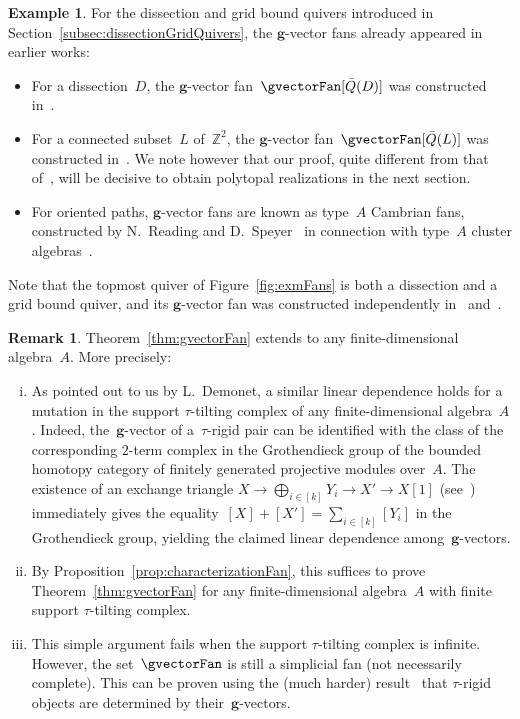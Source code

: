 \documentclass{memo-l}
\theoremstyle{definition}
\newtheorem{example}[theorem]{Example}
\newtheorem{remark}[theorem]{Remark}
\newcommand{\Z}{\mathbb{Z}} %
\renewcommand{\b}[1]{\mathbf{#1}} %
\newcommand{\fref}[1]{Figure~\ref{#1}} %
\begin{document}
\begin{example}
For the dissection and grid bound quivers introduced in Section~\ref{subsec:dissectionGridQuivers}, the $\b{g}$-vector fans already appeared in earlier works:
\begin{itemize}
\item For a dissection~$D$, the $\b{g}$-vector fan~$\gvectorFan[\bar Q(D)]$ was constructed in~\cite{MannevillePilaud-accordion}.
\item For a connected subset~$L$ of~$\Z^2$, the $\b{g}$-vector fan~$\gvectorFan[\bar Q(L)]$ was constructed in~\cite{GarverMcConville-grid}. We note however that our proof, quite different from that of~\cite{GarverMcConville-grid}, will be decisive to obtain polytopal realizations in the next section.
\item For oriented paths, $\b{g}$-vector fans are known as type~$A$ Cambrian fans, constructed by N.~Reading and D.~Speyer~\cite{ReadingSpeyer} in connection with type~$A$ cluster algebras~\cite{FominZelevinsky-ClusterAlgebrasI, FominZelevinsky-ClusterAlgebrasII}.
\end{itemize}
Note that the topmost quiver of \fref{fig:exmFans} is both a dissection and a grid bound quiver, and its $\b{g}$-vector fan was constructed independently in~\cite{MannevillePilaud-accordion} and~\cite{GarverMcConville-grid}.
\end{example}

\begin{remark}
\label{rem:linDep}
Theorem~\ref{thm:gvectorFan} extends to any finite-dimensional algebra~$A$. More precisely:
\begin{enumerate}[(i)]
\item As pointed out to us by L.~Demonet, a similar linear dependence holds for a mutation in the support $\tau$-tilting complex of any finite-dimensional algebra~$A$.
Indeed, the~$\b{g}$-vector of a~$\tau$-rigid pair can be identified with the class of the corresponding $2$-term complex in the Grothendieck group of the bounded homotopy category of finitely generated projective modules over~$A$.
The existence of an exchange triangle ${X \rightarrow \bigoplus_{i \in [k]} Y_i \rightarrow X' \rightarrow X[1]}$ (see~\cite{AiharaIyama}) immediately gives the equality~$[X] + [X'] = \sum_{i \in [k]} [Y_i]$ in the Grothendieck group, yielding the claimed linear dependence among~$\b{g}$-vectors.
\item By Proposition~\ref{prop:characterizationFan}, this suffices to prove Theorem~\ref{thm:gvectorFan} for any finite-dimensio\-nal algebra~$A$ with finite support $\tau$-tilting complex. 
\item This simple argument fails when the support $\tau$-tilting complex is infinite. However, the set~$\gvectorFan$ is still a simplicial fan (not necessarily complete). This can be proven using the (much harder) result~\cite{DehyKeller, DemonetIyamaJasso} that $\tau$-rigid objects are determined by their~$\b{g}$-vectors.
\end{enumerate}
\end{remark}
\end{document}
